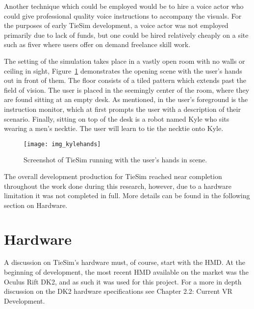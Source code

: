 Another technique which could be employed would be to hire a voice actor who could give professional quality voice instructions to accompany the visuals. For the purposes of early TieSim development, a voice actor was not employed primarily due to lack of funds, but one could be hired relatively cheaply on a site such as fiver where users offer on demand freelance skill work.

The setting of the simulation takes place in a vastly open room with no walls or ceiling in sight, Figure~\ref{figure:f_kyle} demonstrates the opening scene with the user's hands out in front of them. The floor consists of a tiled pattern which extends past the field of vision. The user is placed in the seemingly center of the room, where they are found sitting at an empty desk. As mentioned, in the user's foreground is the instruction monitor, which at first prompts the user with a description of their scenario. Finally, sitting on top of the desk is a robot named Kyle who sits wearing a men's necktie. The user will learn to tie the necktie onto Kyle. 

\begin{figure}
  \centering
  \texttt{[image: img\_kylehands]}
  \caption{Screenshot of TieSim running with the user's hands in scene.}
  \label{figure:f_kyle}
\end{figure}

The overall development production for TieSim reached near completion throughout the work done during this research, however, due to a hardware limitation it was not completed in full. More details can be found in the following section on Hardware.

\section{Hardware}
\label{sec:hardware}

A discussion on TieSim's hardware must, of course, start with the HMD. At the beginning of development, the most recent HMD available on the market was the Oculus Rift DK2, and as such it was used for this project. For a more in depth discussion on the DK2 hardware specifications see Chapter 2.2: Current VR Development. 

